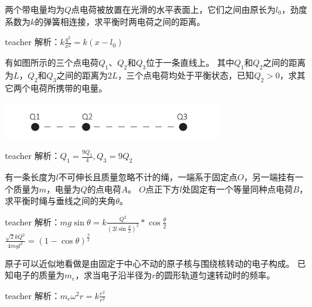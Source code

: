 \begin{example}
两个带电量均为$Q$点电荷被放置在光滑的水平表面上，它们之间由原长为$l_0$，劲度系数为$k$的弹簧相连接，求平衡时两电荷之间的距离。
\begin{taggedblock}{teacher}
\newline
解析：$k\frac{q^2}{x^2}=k(x-l_0)$
\end{taggedblock}
\end{example}

\begin{example}
有如图所示的三个点电荷$Q_1$、$Q_2$和$Q_3$位于一条直线上。
其中$Q_1$和$Q_2$之间的距离为$L$，$Q_2$和$Q_3$之间的距离为$2L$，三个点电荷均处于平衡状态，已知$Q_2>0$，求其它两个电荷所携带的电量。
\begin{flushright}
\includegraphics[width=0.7\textwidth]{images/elec-problem-0.pdf}
\end{flushright}
\begin{taggedblock}{teacher}
\noindent
解析：$Q_1=\frac{9Q_2}{4},Q_3=9Q_2$
\end{taggedblock}
\end{example}

\begin{example}
有一条长度为$l$不可伸长且质量忽略不计的绳，一端系于固定点$O$，另一端挂有一个质量为$m$，电量为$Q$的点电荷$A$。
$O$点正下方$l$处固定有一个等量同种点电荷$B$，求平衡时绳与垂线之间的夹角$\theta$。
\begin{taggedblock}{teacher}
\newline
解析：$mg\sin\theta=k\frac{Q^2}{(2l\sin\frac{\theta}{2})^2}*\cos\frac{\theta}{2}$
\\$\frac{\sqrt{2}kQ^2}{4mgl^2}=(1-\cos\theta)^{\frac{3}{2}}$
\end{taggedblock}
\end{example}

\begin{example}
原子可以近似地看做是由固定于中心不动的原子核与围绕核转动的电子构成。
已知电子的质量为$m_e$，求当电子沿半径为$r$的圆形轨道匀速转动时的频率。
\begin{taggedblock}{teacher}
\newline
解析：$m_e\omega^2r=k\frac{e^2}{r^2}$
\end{taggedblock}
\end{example}



